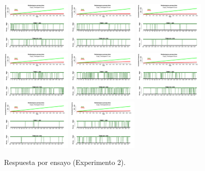 \begin{figure}[th]
\includegraphics[width=0.30\textwidth]{Figures/Success_Exp2_P13} \includegraphics[width=0.30\textwidth]{Figures/Success_Exp2_P14} \includegraphics[width=0.30\textwidth]{Figures/Success_Exp2_P15}
\includegraphics[width=0.30\textwidth]{Figures/Success_Exp2_P16} \includegraphics[width=0.30\textwidth]{Figures/Success_Exp2_P17} \includegraphics[width=0.30\textwidth]{Figures/Success_Exp2_P18}
\includegraphics[width=0.30\textwidth]{Figures/Success_Exp2_P19} \includegraphics[width=0.30\textwidth]{Figures/Success_Exp2_P20} 
\caption[Response_Exp2]{Respuesta por ensayo (Experimento 2).}
\label{fig:Response_E2}
\end{figure}



